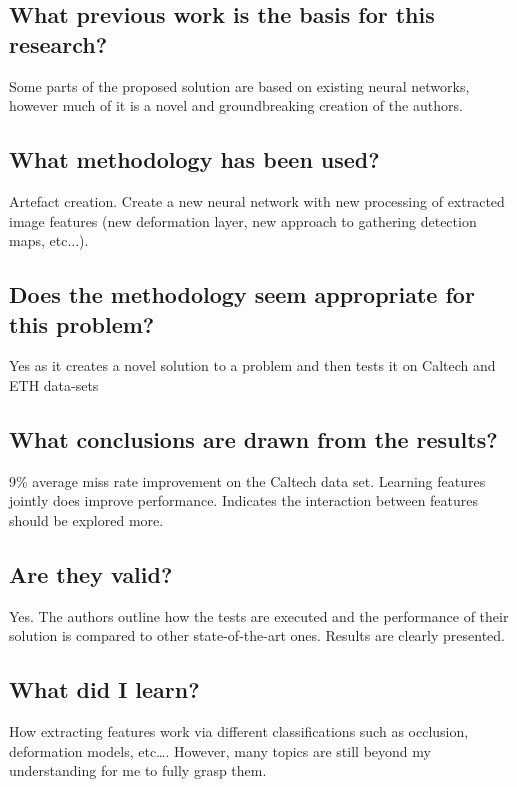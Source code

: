 \documentclass[11pt,a4paper]{article}
\begin{document}
\subsection*{What previous work is the basis for this research?}
Some parts of the proposed solution are based on existing neural networks, however much of it is a novel and groundbreaking creation of the authors. 

\subsection*{What methodology has been used?}
Artefact creation. Create a new neural network with new processing of extracted image features (new deformation layer, new approach to gathering detection maps, etc...). 

\subsection*{Does the methodology seem appropriate for this problem?}
Yes as it creates a novel solution to a problem and then tests it on Caltech and ETH data-sets


\subsection*{What conclusions are drawn from the results?}
9\% average miss rate improvement on the Caltech data set. Learning features jointly does improve performance. Indicates the interaction between features should be explored more.

\subsection*{Are they valid?}
Yes. The authors outline how the tests are executed and the performance of their solution is compared to other state-of-the-art ones. Results are clearly presented.

\subsection*{What did I learn?}
How extracting features work via different classifications such as occlusion, deformation models, etc…. However, many topics are still beyond my understanding for me to fully grasp them.
\end{document}
